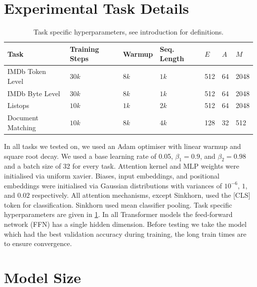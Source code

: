 \section{Experimental Task Details}\label{appendix:tasks}

\begin{table}[!h]
    \caption{Task specific hyperparameters, see introduction for definitions.}
    \label{table:hyperparams}
    \begin{center}
        \begin{tabular}{l | l l l l l l}
            \toprule
            {\bf Task} & \textbf{Training Steps} & \textbf{Warmup} & \textbf{Seq. Length} & $E$ & $A$ & $M$ \\
            \midrule
            IMDb Token Level & $30k$ & $8k$ & $1k$ & 512 & 64 & 2048 \\
            IMDb Byte Level & $30k$ & $8k$ & $1k$ & 512 & 64 & 2048 \\
            Listops & $10k$ & $1k$ & $2k$ & 512 & 64 & 2048 \\
            Document Matching & $10k$ & $8k$ & $4k$ & 128 & 32 & 512 \\
            \bottomrule
        \end{tabular}
    \end{center}
\end{table}

In all tasks we tested on, we used an Adam optimiser with linear warmup and square root decay.
We used a base learning rate of 0.05, $\beta_1=0.9$, and $\beta_2=0.98$ and a batch size of 32 for every task.
Attention kernel and MLP weights were initialised via uniform xavier.
Biases, input embeddings, and positional embeddings were initialised via Gaussian distributions with variances of $10^{-6}$, $1$, and $0.02$ respectively. 
All attention mechanisms, except Sinkhorn, used the [CLS] token for classification.
Sinkhorn used mean classifier pooling.
Task specific hyperparameters are given in \cref{table:hyperparams}.
In all Transformer models the feed-forward network (FFN) has a single hidden dimension.
Before testing we take the model which had the best validation accuracy during training, the long train times are to ensure convergence.


\section{Model Size}\label{appendix:model_size}

